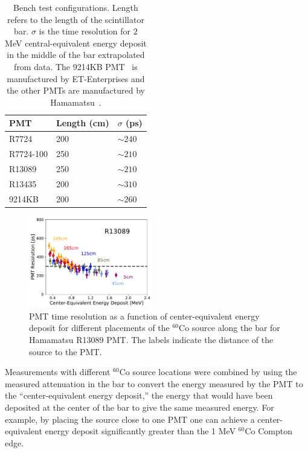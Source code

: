 \documentclass[3p,final,twocolumn]{elsarticle}
\begin{document}
\begin{table}[t]
	\caption{Bench test configurations. Length refers to the length of the scintillator bar.  $\sigma$ is the time
          resolution for $2$ \si{\mega\electronvolt} central-equivalent energy deposit in the middle of the bar
          extrapolated from data.  The 9214KB PMT~\cite{pmt9214} is manufactured by ET-Enterprises and the other PMTs are manufactured by Hamamatsu~\cite{hamapmts}.}
    \centering
	\begin{tabular}{ m{5em}   m{3em}   m{3em} }
		\hline
			PMT & Length (cm) & $\sigma$ (\si{\pico\second})\\
		\hline\hline
			R7724 &  200 &  $\sim240	$	\\
			R7724-100 & 250 & $\sim210$ 		\\
			R13089 & 250 & $\sim210	$		\\			
			R13435 & 200 & $\sim310$			\\		
			9214KB & 200 & $\sim260$			\\
		\hline
	\end{tabular}
	\label{tab:tests}
\end{table}
\begin{figure}[tb]
	\centering
		\includegraphics[width=0.48\textwidth]{pos-dep.pdf}
		\caption{PMT time resolution as a function of
                  center-equivalent energy deposit for different
                  placements of the $^{60}$Co source along the bar for
                  Hamamatsu R13089 PMT. The labels indicate the
                  distance of the source to the PMT. }
	\label{fig:test_stand_posdep}
\end{figure}

Measurements with different $^{60}$Co
source locations were combined by using the measured attenuation in the bar to convert
the energy measured by the PMT to the ``center-equivalent energy
deposit,'' the energy that would have been deposited at the center of
the bar to give the same measured energy.  For example, by placing the
source close to one PMT one can achieve a center-equivalent energy
deposit significantly greater than the 1 \si{\mega\electronvolt} $^{60}$Co Compton edge.
\end{document}
